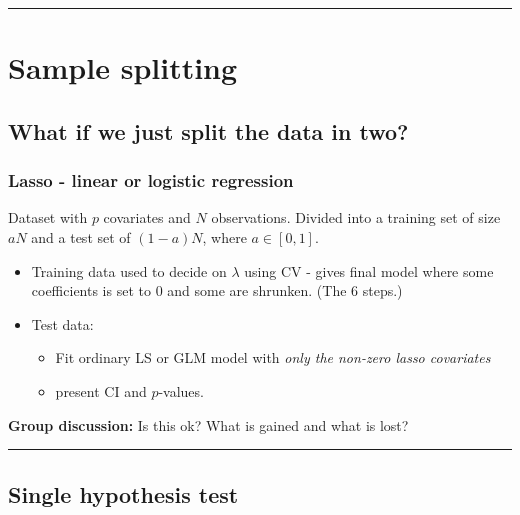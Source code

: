 \documentclass[
  letterpaper,
  DIV=11,
  numbers=noendperiod]{scrartcl}
\providecommand{\tightlist}{%
  \setlength{\itemsep}{0pt}\setlength{\parskip}{0pt}}\usepackage{longtable,booktabs,array}
\begin{document}
\begin{center}\rule{0.5\linewidth}{0.5pt}\end{center}

\hypertarget{sample-splitting}{%
\section{Sample splitting}\label{sample-splitting}}

\hypertarget{what-if-we-just-split-the-data-in-two}{%
\subsection{What if we just split the data in
two?}\label{what-if-we-just-split-the-data-in-two}}

\hypertarget{lasso---linear-or-logistic-regression}{%
\subsubsection{Lasso - linear or logistic
regression}\label{lasso---linear-or-logistic-regression}}

Dataset with \(p\) covariates and \(N\) observations. Divided into a
training set of size \(aN\) and a test set of \((1-a)N\), where
\(a \in [0,1]\).

\begin{itemize}
\item
  Training data used to decide on \(\lambda\) using CV - gives final
  model where some coefficients is set to 0 and some are shrunken. (The
  6 steps.)
\item
  Test data:

  \begin{itemize}
  \tightlist
  \item
    Fit ordinary LS or GLM model with \emph{only the non-zero lasso
    covariates}
  \item
    present CI and \(p\)-values.
  \end{itemize}
\end{itemize}

\textbf{Group discussion:} Is this ok? What is gained and what is lost?

\begin{center}\rule{0.5\linewidth}{0.5pt}\end{center}

\hypertarget{single-hypothesis-test}{%
\subsection{Single hypothesis test}\label{single-hypothesis-test}}
\end{document}
